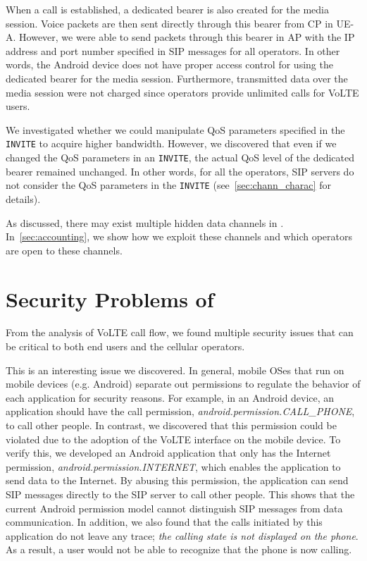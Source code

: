 When a call is established, a dedicated bearer is also
created for the media session. Voice packets are then sent directly through this bearer from
CP in UE-A.  However, we were able to send packets through this bearer in AP with the
IP address and port number specified in SIP messages for all operators.
In other words, the Android device does not have proper access control for using
the dedicated bearer for the media session.
Furthermore, transmitted data over the media session were not charged
since operators provide unlimited calls for VoLTE users.


We investigated whether we could manipulate QoS parameters specified in the {\tt
INVITE} to acquire higher bandwidth. However, we discovered that even if we
changed the QoS parameters in an {\tt INVITE}, the actual QoS level of the
dedicated bearer remained unchanged. In other words, for all the operators, SIP
servers do not consider the QoS parameters in the {\tt INVITE}
(see~\autoref{sec:chann_charac} for details).

 As discussed, there may exist multiple hidden data channels in
\vt. In~\autoref{sec:accounting}, we show how we exploit these channels and
which operators are open to these channels.

\section{Security Problems of \vt}
\label{sec:security_prob}
From the analysis of VoLTE call flow, we found multiple security issues that can
be critical to both end users and the cellular operators.

 This is an
interesting issue we discovered.  In general, mobile OSes that run on mobile
devices (e.g. Android) separate out permissions
to regulate the behavior of each application for security
reasons.  For example, in an Android device, an application should
have the call permission, \textit{android.permission.CALL\_PHONE}, to call
other people. In contrast, we discovered that this permission could be violated
due to the adoption of the VoLTE interface on the mobile device. To verify this, we
developed an Android application that only has the Internet permission,
\textit{android.permission.INTERNET}, which enables the application to
send data to the Internet. By abusing this permission, the application can
send SIP messages directly to the SIP server to call other people. This shows
that the current Android permission model cannot distinguish SIP messages
from data communication. In addition, we also found that the calls initiated
by this application do not leave any trace; \textit{the calling state is not displayed on the
phone}. As a result, a user would not be able to recognize that the phone is now
calling.

